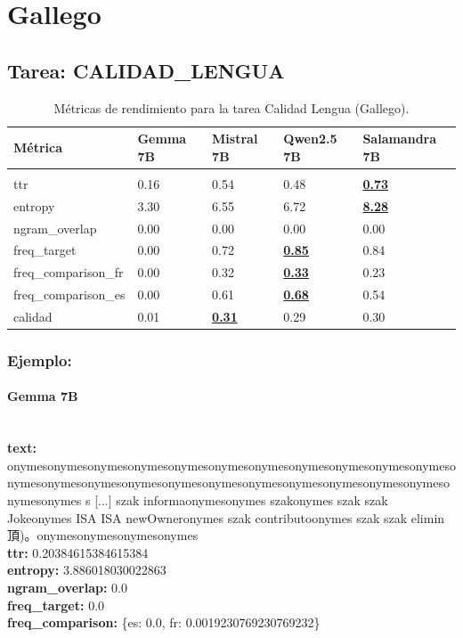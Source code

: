 \section{Gallego}

\subsection{Tarea: CALIDAD\_LENGUA}\label{tarea-calidad_lengua}
\begin{longtable}[]{@{}lllll@{}}
\toprule\noalign{}
Métrica & Gemma 7B & Mistral 7B & Qwen2.5 7B & Salamandra 7B \\
\midrule\noalign{}
\endhead
\bottomrule\noalign{}
\caption{Métricas de rendimiento para la tarea Calidad Lengua (Gallego).}
\label{tab:metricas_calidad_lengua_Gallego}\\
\endlastfoot
ttr & 0.16 & 0.54 & 0.48 & \textbf{\underline{0.73}} \\
entropy & 3.30 & 6.55 & 6.72 & \textbf{\underline{8.28}} \\
ngram\_overlap & 0.00 & 0.00 & 0.00 & 0.00 \\
freq\_target & 0.00 & 0.72 & \textbf{\underline{0.85}} & 0.84 \\
freq\_comparison\_fr & 0.00 & 0.32 & \textbf{\underline{0.33}} & 0.23 \\
freq\_comparison\_es & 0.00 & 0.61 & \textbf{\underline{0.68}} & 0.54 \\
calidad & 0.01 & \textbf{\underline{0.31}} & 0.29 & 0.30 \\
\end{longtable}

\subsubsection{Ejemplo:}

\paragraph{Gemma 7B}~\\
\textbf{text:} onymesonymesonymesonymesonymesonymesonymesonymesonymesonymesonymesonymesonymesonymesonymesonymesonymesonymesonymesonymesonymesonymesonymesonymes s [...] szak informaonymesonymes szakonymes szak szak Jokeonymes ISA ISA newOwneronymes szak contributoonymes szak szak elimin 頂)。onymesonymesonymesonymes\\
\textbf{ttr:} 0.20384615384615384\\
\textbf{entropy:} 3.886018030022863\\
\textbf{ngram\_overlap:} 0.0\\
\textbf{freq\_target:} 0.0\\
\textbf{freq\_comparison:} \{\textquotesingle{}es\textquotesingle{}: 0.0, \textquotesingle{}fr\textquotesingle{}: 0.0019230769230769232\}

